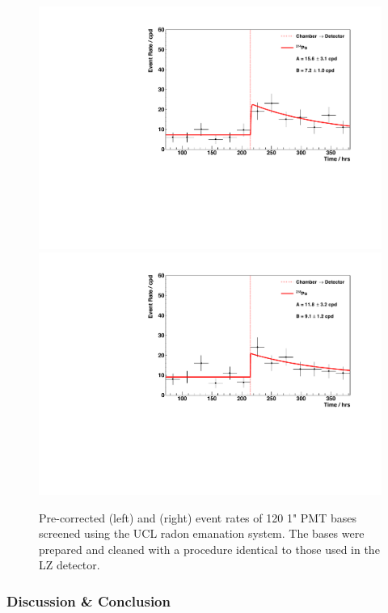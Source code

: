 \begin{figure}[h!]
    \centering
    \includegraphics[scale=0.42]{Chapter_4/Figures/ucl_measurements/1_inch_base_Po214.pdf}
    \includegraphics[scale=0.42]{Chapter_4/Figures/ucl_measurements/1_inch_bases_Po218.pdf}
    \caption[Pre-corrected \PoTOF{} (left) and \PoTOE{} (right) event rates of 120 1" PMT bases screening, representative of those that are used in LZ.]
    {Pre-corrected \PoTOF{} (left) and \PoTOE{} (right) event rates of 120 1" PMT bases screened using the UCL radon emanation system. The bases were prepared and cleaned with a procedure identical to those used in the LZ detector.}
    \label{fig:1_inch_pmt_base_result}
\end{figure}
%


\subsubsection{Discussion \& Conclusion}

